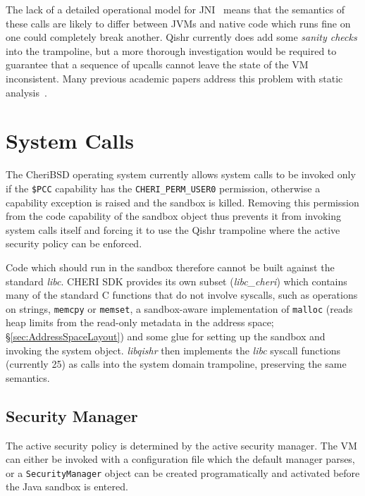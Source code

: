 \documentclass[a4paper,12pt,twoside,openright]{report}
\newcommand{\reg}[1]{\texttt{\$#1}}
\newcommand{\class}[1]{\texttt{#1}}
\newcommand{\tool}[1]{\emph{#1}}
\newcommand{\lib}[1]{\tool{lib#1}}
\begin{document}
The lack of a detailed operational model for JNI~\cite{Tan:2010:JNIFormalModel} means that the semantics of these calls are likely to differ between JVMs and native code which runs fine on one could completely break another. Qishr currently does add some \emph{sanity checks} into the trampoline, but a more thorough investigation would be required to guarantee that a sequence of upcalls cannot leave the state of the VM inconsistent. Many previous academic papers address this problem with static analysis~\cite{Kondoh:2008:FBJ:1390630.1390645, Li:2009:FBE:1653662.1653716, Li:2011:JEC:2048066.2048095}.

\section{System Calls}

The CheriBSD operating system currently allows system calls to be invoked only if the \reg{PCC} capability has the \texttt{CHERI\_PERM\_USER0} permission, otherwise a capability exception is raised and the sandbox is killed. Removing this permission from the code capability of the sandbox object thus prevents it from invoking system calls itself and forcing it to use the Qishr trampoline where the active security policy can be enforced.

Code which should run in the sandbox therefore cannot be built against the standard \lib{c}. CHERI SDK provides its own subset (\lib{c\_cheri}) which contains many of the standard C functions that do not involve syscalls, such as operations on strings, \texttt{memcpy} or \texttt{memset}, a sandbox-aware implementation of \texttt{malloc} (reads heap limits from the read-only metadata in the address space; \S\ref{sec:AddressSpaceLayout}) and some glue for setting up the sandbox and invoking the system object. \lib{qishr} then implements the \lib{c} syscall functions (currently 25) as calls into the system domain trampoline, preserving the same semantics.

\subsection{Security Manager}

The active security policy is determined by the active security manager. The VM can either be invoked with a configuration file which the default manager parses, or a \class{Security\-Manager} object can be created programatically and activated before the Java sandbox is entered.
\end{document}
